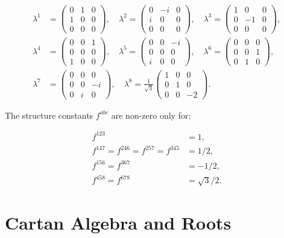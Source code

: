 \[
\begin{aligned}
\lambda^1 &= \begin{pmatrix}0&1&0\\1&0&0\\0&0&0\end{pmatrix},\quad
\lambda^2 = \begin{pmatrix}0&-i&0\\i&0&0\\0&0&0\end{pmatrix},\quad
\lambda^3 = \begin{pmatrix}1&0&0\\0&-1&0\\0&0&0\end{pmatrix}, \\[6pt]
\lambda^4 &= \begin{pmatrix}0&0&1\\0&0&0\\1&0&0\end{pmatrix},\quad
\lambda^5 = \begin{pmatrix}0&0&-i\\0&0&0\\i&0&0\end{pmatrix},\quad
\lambda^6 = \begin{pmatrix}0&0&0\\0&0&1\\0&1&0\end{pmatrix}, \\[6pt]
\lambda^7 &= \begin{pmatrix}0&0&0\\0&0&-i\\0&i&0\end{pmatrix},\quad
\lambda^8 = \frac{1}{\sqrt{3}}\begin{pmatrix}1&0&0\\0&1&0\\0&0&-2\end{pmatrix}.
\end{aligned}
\]

The structure constants $f^{abc}$ are non-zero only for:

\[
\begin{aligned}
f^{123} &= 1, \\
f^{147} = f^{246} = f^{257} = f^{345} &= 1/2, \\
f^{156} = f^{367} &= -1/2, \\
f^{458} = f^{678} &= \sqrt{3}/2.
\end{aligned}
\]

\section{Cartan Algebra and Roots}

